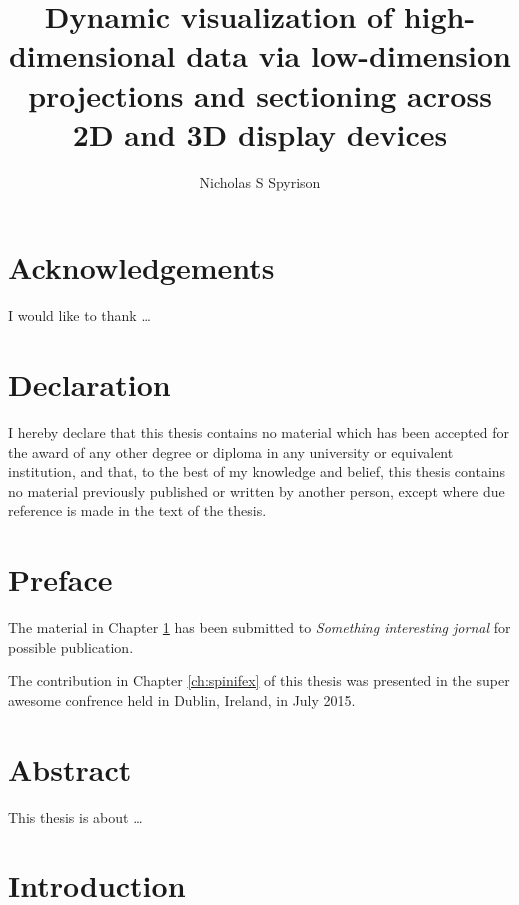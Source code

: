 \documentclass{monashthesis}
\author{Nicholas S Spyrison}
\title{Dynamic visualization of high-dimensional data via low-dimension projections and sectioning across 2D and 3D display devices}
\begin{document}

\titlepage

{\sf\tighttoc\doublespacing}

\hypertarget{acknowledgements}{%
\chapter*{Acknowledgements}\label{acknowledgements}}

I would like to thank \dots

\hypertarget{declaration}{%
\chapter*{Declaration}\label{declaration}}

I hereby declare that this thesis contains no material which has been accepted for the award of any other degree or diploma in any university or equivalent institution, and that, to the best of my knowledge and belief, this thesis contains no material previously published or written by another person, except where due reference is made in the text of the thesis.

\vspace*{2cm}\par\authorname

\hypertarget{preface}{%
\chapter*{Preface}\label{preface}}

The material in Chapter \ref{ch:intro} has been submitted to \emph{Something interesting jornal} for possible publication.

The contribution in Chapter \ref{ch:spinifex} of this thesis was presented in the super awesome confrence held in Dublin, Ireland, in July 2015.

\hypertarget{abstract}{%
\chapter*{Abstract}\label{abstract}}

This thesis is about \ldots{}

\clearpage{}\setcounter{page}{0}

\hypertarget{ch:intro}{%
\chapter{Introduction}\label{ch:intro}}
\end{document}
